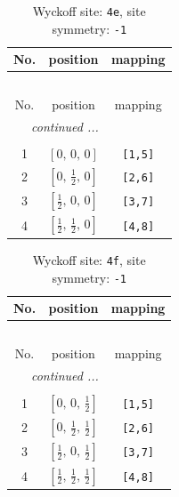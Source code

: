 \documentclass[fleqn,8pt]{jsarticle}
\begin{document}
\begin{longtable}{ccc}
\caption{Wyckoff site: {\tt 4e}, site symmetry: {\tt -1}}
 \\
 \hline \hline
No. & position & mapping \\ \hline \endfirsthead

\multicolumn{2}{l}{\tablename\ \thetable{}} \\
 \hline \hline
No. & position & mapping \\ \hline \endhead

 \hline \hline
\multicolumn{2}{r}{\footnotesize\it continued ...} \\ \endfoot

 \hline \hline
\multicolumn{2}{r}{} \\ \endlastfoot

1 & $\left[ 0,\, 0,\, 0 \right]$ & {\tt [1,5]} \\ \hline
2 & $\left[ 0,\, \frac{1}{2},\, 0 \right]$ & {\tt [2,6]} \\ \hline
3 & $\left[ \frac{1}{2},\, 0,\, 0 \right]$ & {\tt [3,7]} \\ \hline
4 & $\left[ \frac{1}{2},\, \frac{1}{2},\, 0 \right]$ & {\tt [4,8]} \\
\end{longtable}
\renewcommand{\arraystretch}{1.2}
\begin{longtable}{ccc}
\caption{Wyckoff site: {\tt 4f}, site symmetry: {\tt -1}}
 \\
 \hline \hline
No. & position & mapping \\ \hline \endfirsthead

\multicolumn{2}{l}{\tablename\ \thetable{}} \\
 \hline \hline
No. & position & mapping \\ \hline \endhead

 \hline \hline
\multicolumn{2}{r}{\footnotesize\it continued ...} \\ \endfoot

 \hline \hline
\multicolumn{2}{r}{} \\ \endlastfoot

1 & $\left[ 0,\, 0,\, \frac{1}{2} \right]$ & {\tt [1,5]} \\ \hline
2 & $\left[ 0,\, \frac{1}{2},\, \frac{1}{2} \right]$ & {\tt [2,6]} \\ \hline
3 & $\left[ \frac{1}{2},\, 0,\, \frac{1}{2} \right]$ & {\tt [3,7]} \\ \hline
4 & $\left[ \frac{1}{2},\, \frac{1}{2},\, \frac{1}{2} \right]$ & {\tt [4,8]} \\
\end{longtable}
\end{document}
